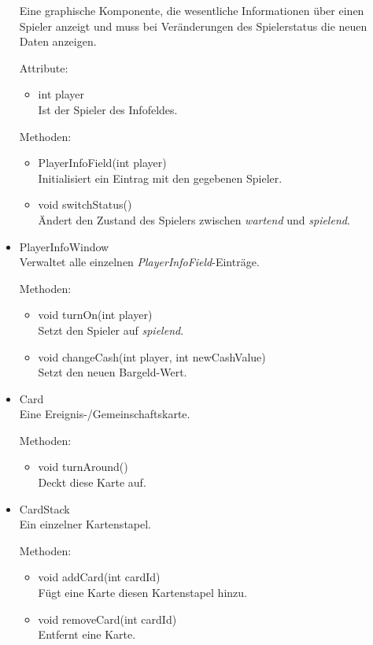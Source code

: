\documentclass[a4paper,10pt]{article}
\begin{document}
\begin{itemize}
Eine graphische Komponente, die wesentliche Informationen über einen Spieler anzeigt und muss bei Veränderungen des Spielerstatus die neuen Daten anzeigen.

Attribute:
\begin{itemize}
\item int player \\
Ist der Spieler des Infofeldes.
\end{itemize}

Methoden:
\begin{itemize}
\item PlayerInfoField(int player) \\
Initialisiert ein Eintrag mit den gegebenen Spieler.
\item void switchStatus() \\
Ändert den Zustand des Spielers zwischen \textit{wartend} und \textit{spielend}.
\end{itemize}

\item PlayerInfoWindow \\
Verwaltet alle einzelnen \textit{PlayerInfoField}-Einträge.

Methoden:
\begin{itemize}
\item void turnOn(int player)
\\Setzt den Spieler auf \textit{spielend}.
\item void changeCash(int player, int newCashValue)
\\Setzt den neuen Bargeld-Wert.
\end{itemize}

\item Card \\
Eine Ereignis-/Gemeinschaftskarte.

Methoden:
\begin{itemize}
\item void turnAround() \\
Deckt diese Karte auf.
\end{itemize}

\item CardStack\\
Ein einzelner Kartenstapel.

Methoden:
\begin{itemize}
\item void addCard(int cardId) \\
Fügt eine Karte diesen Kartenstapel hinzu.
\item void removeCard(int cardId) \\
Entfernt eine Karte.
\end{itemize}


\end{itemize}
\end{document}
